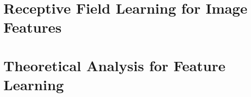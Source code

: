 \chapter{Receptive Field Learning for Image Features}\label{chapter:pooling}



\chapter{Theoretical Analysis for Feature Learning}\label{chapter:nystrom}




